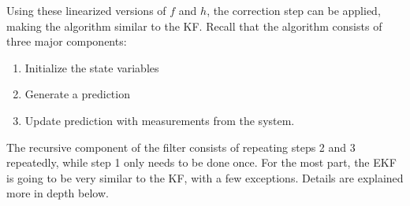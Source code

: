     
    
  \noindent Using these linearized versions of $f$ and $h$, the correction step can be applied, making the algorithm similar to the KF. Recall that the algorithm consists of three major components:
\begin{enumerate}
  \item Initialize the state variables
  \item Generate a prediction
  \item Update prediction with measurements from the system.
\end{enumerate}
The recursive component of the filter consists of repeating steps 2 and 3 repeatedly, while step 1 only needs to be done once. For the most part, the EKF is going to be very similar to the KF, with a few exceptions. Details are explained more in depth below. \\

